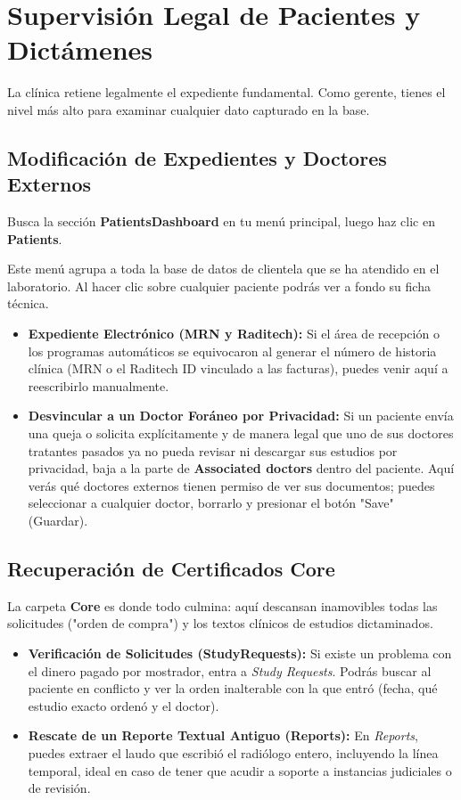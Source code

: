 \section{Supervisión Legal de Pacientes y Dictámenes}

La clínica retiene legalmente el expediente fundamental. Como gerente, tienes el nivel más alto para examinar cualquier dato capturado en la base.

\subsection{Modificación de Expedientes y Doctores Externos}

Busca la sección \textbf{PatientsDashboard} en tu menú principal, luego haz clic en \textbf{Patients}.

Este menú agrupa a toda la base de datos de clientela que se ha atendido en el laboratorio. Al hacer clic sobre cualquier paciente podrás ver a fondo su ficha técnica.
\begin{itemize}
    \item \textbf{Expediente Electrónico (MRN y Raditech):} Si el área de recepción o los programas automáticos se equivocaron al generar el número de historia clínica (MRN o el Raditech ID vinculado a las facturas), puedes venir aquí a reescribirlo manualmente.
    \item \textbf{Desvincular a un Doctor Foráneo por Privacidad:} Si un paciente envía una queja o solicita explícitamente y de manera legal que uno de sus doctores tratantes pasados ya no pueda revisar ni descargar sus estudios por privacidad, baja a la parte de \textbf{Associated doctors} dentro del paciente. Aquí verás qué doctores externos tienen permiso de ver sus documentos; puedes seleccionar a cualquier doctor, borrarlo y presionar el botón "Save" (Guardar).
\end{itemize}

\subsection{Recuperación de Certificados Core}

La carpeta \textbf{Core} es donde todo culmina: aquí descansan inamovibles todas las solicitudes ("orden de compra") y los textos clínicos de estudios dictaminados.

\begin{itemize}
    \item \textbf{Verificación de Solicitudes (StudyRequests):} Si existe un problema con el dinero pagado por mostrador, entra a \textit{Study Requests}. Podrás buscar al paciente en conflicto y ver la orden inalterable con la que entró (fecha, qué estudio exacto ordenó y el doctor).
    \item \textbf{Rescate de un Reporte Textual Antiguo (Reports):} En \textit{Reports}, puedes extraer el laudo que escribió el radiólogo entero, incluyendo la línea temporal, ideal en caso de tener que acudir a soporte a instancias judiciales o de revisión.
\end{itemize}
